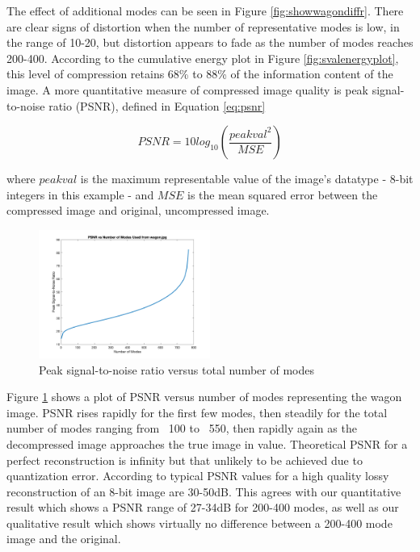 \documentclass[conference]{IEEEtran}
\begin{document}
    The effect of additional modes can be seen in Figure \ref{fig:showwagondiffr}. There are clear signs of distortion when the number of representative modes is low, in the range of 10-20, but distortion appears to fade as the number of modes reaches 200-400. According to the cumulative energy plot in Figure \ref{fig:svalenergyplot}, this level of compression retains 68\% to 88\% of the information content of the image. A more quantitative measure of compressed image quality is peak signal-to-noise ratio (PSNR), defined in Equation \ref{eq:psnr}

    \begin{equation}
    		PSNR = 10log_{10}(\frac{peakval^2}{MSE})
    \label{eq:psnr}
    \end{equation}

    where $peakval$ is the maximum representable value of the image's datatype - 8-bit integers in this example - and $MSE$ is the mean squared error between the compressed image and original, uncompressed image.

	\begin{figure}[t]
        \includegraphics[width=0.5\textwidth]{snrvsr_wagon_rgb}
        \caption{Peak signal-to-noise ratio versus total number of modes}
        \label{fig:psnrvsr_wagon}
    \end{figure}
    
    Figure \ref{fig:psnrvsr_wagon} shows a plot of PSNR versus number of modes representing the wagon image. PSNR rises rapidly for the first few modes, then steadily for the total number of modes ranging from ~100 to ~550, then rapidly again as the decompressed image approaches the true image in value. Theoretical PSNR for a perfect reconstruction is infinity but that unlikely to be achieved due to quantization error. According to \cite{psnr_quality} typical PSNR values for a high quality lossy reconstruction of an 8-bit image are 30-50dB. This agrees with our quantitative result which shows a PSNR range of 27-34dB for 200-400 modes, as well as our qualitative result which shows virtually no difference between a 200-400 mode image and the original.
\end{document}
